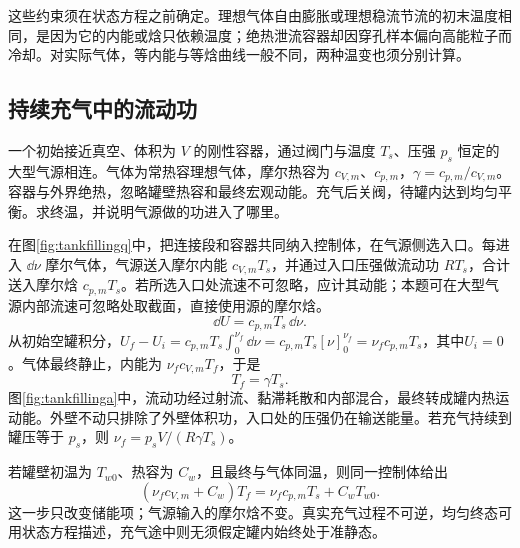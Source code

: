 这些约束须在状态方程之前确定。理想气体自由膨胀或理想稳流节流的初末温度相同，是因为它的内能或焓只依赖温度；绝热泄流容器却因穿孔样本偏向高能粒子而冷却。对实际气体，等内能与等焓曲线一般不同，两种温变也须分别计算。

\subsection{持续充气中的流动功}
\begin{example}[绝热刚性空罐的充气温度]
\label{ex:tankfilling}
一个初始接近真空、体积为 $V$ 的刚性容器，通过阀门与温度 $T_s$、压强 $p_s$ 恒定的大型气源相连。气体为常热容理想气体，摩尔热容为 $c_{V,m}$、$c_{p,m}$，$\gamma=c_{p,m}/c_{V,m}$。容器与外界绝热，忽略罐壁热容和最终宏观动能。充气后关阀，待罐内达到均匀平衡。求终温，并说明气源做的功进入了哪里。
\end{example}
\begin{solution}
在图\ref{fig:tankfillingq}中，把连接段和容器共同纳入控制体，在气源侧选入口。每进入 $\dd\nu$ 摩尔气体，气源送入摩尔内能 $c_{V,m}T_s$，并通过入口压强做流动功 $RT_s$，合计送入摩尔焓 $c_{p,m}T_s$。若所选入口处流速不可忽略，应计其动能；本题可在大型气源内部流速可忽略处取截面，直接使用源的摩尔焓。
\[
 \dd U=c_{p,m}T_s\,\dd\nu.
\]
从初始空罐积分，$U_f-U_i=c_{p,m}T_s\int_0^{\nu_f}\dd\nu=c_{p,m}T_s[\nu]_0^{\nu_f}=\nu_fc_{p,m}T_s$，其中$U_i=0$。气体最终静止，内能为 $\nu_fc_{V,m}T_f$，于是
\[
 T_f=\gamma T_s.
\]
图\ref{fig:tankfillinga}中，流动功经过射流、黏滞耗散和内部混合，最终转成罐内热运动能。外壁不动只排除了外壁体积功，入口处的压强仍在输送能量。若充气持续到罐压等于 $p_s$，则 $\nu_f=p_sV/(R\gamma T_s)$。

若罐壁初温为 $T_{w0}$、热容为 $C_w$，且最终与气体同温，则同一控制体给出
\[
 (\nu_fc_{V,m}+C_w)T_f
 =\nu_fc_{p,m}T_s+C_wT_{w0}.
\]
这一步只改变储能项；气源输入的摩尔焓不变。真实充气过程不可逆，均匀终态可用状态方程描述，充气途中则无须假定罐内始终处于准静态。
\end{solution}

